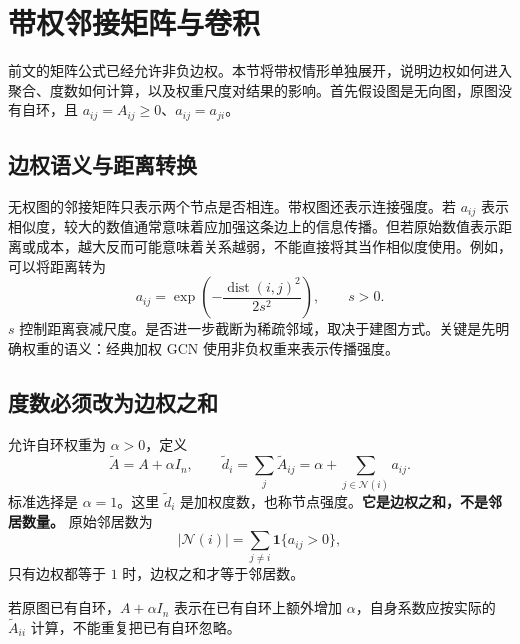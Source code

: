 \documentclass[UTF8,a4paper,11pt,fontset=fandol]{ctexart}
\begin{document}
\section{带权邻接矩阵与卷积}
\label{sec:weighted}
前文的矩阵公式已经允许非负边权。本节将带权情形单独展开，说明边权如何进入聚合、度数如何计算，以及权重尺度对结果的影响。首先假设图是无向图，原图没有自环，且 $a_{ij}=A_{ij}\geq0$、$a_{ij}=a_{ji}$。

\subsection{边权语义与距离转换}
无权图的邻接矩阵只表示两个节点是否相连。带权图还表示连接强度。若 $a_{ij}$ 表示相似度，较大的数值通常意味着应加强这条边上的信息传播。但若原始数值表示距离或成本，越大反而可能意味着关系越弱，不能直接将其当作相似度使用。例如，可以将距离转为
\begin{equation}
a_{ij}=\exp\!\left(-\frac{\operatorname{dist}(i,j)^2}{2s^2}\right),\qquad s>0.
\end{equation}
$s$ 控制距离衰减尺度。是否进一步截断为稀疏邻域，取决于建图方式。关键是先明确权重的语义：经典加权 GCN 使用非负权重来表示传播强度。

\subsection{度数必须改为边权之和}
允许自环权重为 $\alpha>0$，定义
\begin{equation}
\widetilde A=A+\alpha I_n,\qquad
\widetilde d_i=\sum_j\widetilde A_{ij}
=\alpha+\sum_{j\in\mathcal N(i)}a_{ij}.
\label{eq:weighted-degree}
\end{equation}
标准选择是 $\alpha=1$。这里 $\widetilde d_i$ 是加权度数，也称节点强度。\textbf{它是边权之和，不是邻居数量。} 原始邻居数为
\begin{equation}
|\mathcal N(i)|=\sum_{j\ne i}\mathbf 1\{a_{ij}>0\},
\end{equation}
只有边权都等于 $1$ 时，边权之和才等于邻居数。

若原图已有自环，$A+\alpha I_n$ 表示在已有自环上额外增加 $\alpha$，自身系数应按实际的 $\widetilde A_{ii}$ 计算，不能重复把已有自环忽略。
\end{document}
